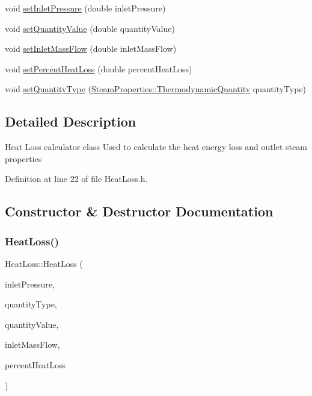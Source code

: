 \begin{DoxyCompactItemize}
void \hyperlink{class_heat_loss_ab0a6b1f2a964d161d25758318f25f7e3}{set\+Inlet\+Pressure} (double inlet\+Pressure)
\item 
void \hyperlink{class_heat_loss_ae6b6c4ac28471d7bc94e3886c48a90bd}{set\+Quantity\+Value} (double quantity\+Value)
\item 
void \hyperlink{class_heat_loss_ac4154dc9922b6ddf3f2e7a10cc64c61f}{set\+Inlet\+Mass\+Flow} (double inlet\+Mass\+Flow)
\item 
void \hyperlink{class_heat_loss_a2a4a80b16c1f975e194ae466b20d46bd}{set\+Percent\+Heat\+Loss} (double percent\+Heat\+Loss)
\item 
void \hyperlink{class_heat_loss_a7c125f1137f31eba8826a1aa3b905290}{set\+Quantity\+Type} (\hyperlink{class_steam_properties_ae0294bedf7d178c2d8fb6aed0f62fbff}{Steam\+Properties\+::\+Thermodynamic\+Quantity} quantity\+Type)
\end{DoxyCompactItemize}


\subsection{Detailed Description}
Heat Loss calculator class Used to calculate the heat energy loss and outlet steam properties 

Definition at line 22 of file Heat\+Loss.\+h.



\subsection{Constructor \& Destructor Documentation}
\mbox{\label{class_heat_loss_a1c1bba4ef783d97e2ed63f39f625e82f}} 
\subsubsection{\texorpdfstring{Heat\+Loss()}{HeatLoss()}}
{\footnotesize\ttfamily Heat\+Loss\+::\+Heat\+Loss (\begin{DoxyParamCaption}\item[{double}]{inlet\+Pressure,  }\item[{\hyperlink{class_steam_properties_ae0294bedf7d178c2d8fb6aed0f62fbff}{Steam\+Properties\+::\+Thermodynamic\+Quantity}}]{quantity\+Type,  }\item[{double}]{quantity\+Value,  }\item[{double}]{inlet\+Mass\+Flow,  }\item[{double}]{percent\+Heat\+Loss }\end{DoxyParamCaption})}

